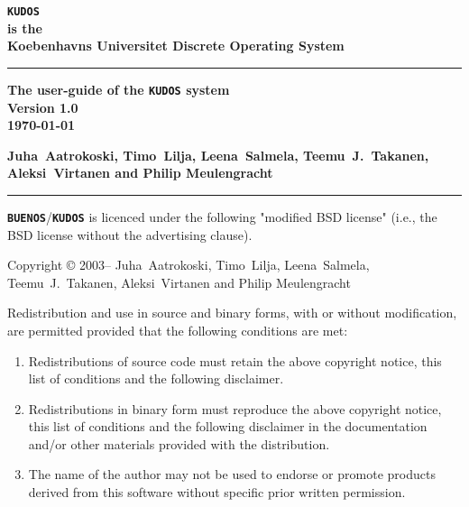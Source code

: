 \documentclass[twoside,a4paper]{report}
\newcommand{\buenos}{\texttt{\textbf{BUENOS}}}
\newcommand{\kudos}{\texttt{\textbf{KUDOS}}}
\newcommand{\authors}{%
Juha~Aatrokoski, Timo~Lilja, Leena~Salmela, %
Teemu~J.~Takanen, Aleksi~Virtanen and Philip Meulengracht%
}
\begin{document}
\pagestyle{plain}
\begin{titlepage}
{
\raggedright\bfseries\Huge
\texttt{KUDOS}\\
\large
\hspace{1em}is the\\
Koebenhavns Universitet Discrete Operating System\\
\rule{\textwidth}{2mm}
\raggedleft\bfseries\large
The user-guide of the \texttt{KUDOS} system\\
Version 1.0\\
\today\\
\raggedright\bfseries\large
\authors{}\\
\rule{\textwidth}{1mm}
}
\newpage
{}
\noindent

\noindent\buenos{}/\kudos{} is licenced under the following "modified BSD
license" (i.e., the BSD license without the advertising clause).

\begin{flushleft}
\vspace{\baselineskip}
Copyright \copyright{} 2003--\number\year{} \authors{}
\vspace{\baselineskip}
\end{flushleft}

Redistribution and use in source and binary forms, with or without
modification, are permitted provided that the following conditions
are met:

\begin{enumerate}
\item Redistributions of source code must retain the above copyright
    notice, this list of conditions and the following disclaimer.
\item Redistributions in binary form must reproduce the above
    copyright notice, this list of conditions and the following
    disclaimer in the documentation and/or other materials provided
    with the distribution.
\item The name of the author may not be used to endorse or promote
    products derived from this software without specific prior
    written permission.
\end{enumerate}


\end{titlepage}
\end{document}
